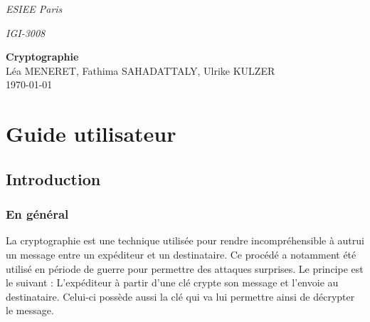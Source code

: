 \documentclass[a4paper,12pt,abstracton,titlepage]{scrartcl}
\begin{document}

{\Large\noindent \emph{ESIEE Paris}}

{\Large\noindent \emph{IGI-3008}}
\vspace{1cm}
\begin{center}
	{\huge \textbf{Cryptographie}
	\\
	\vspace{0.3cm}
	\large Léa MENERET, Fathima SAHADATTALY, Ulrike KULZER
	\\
	\vspace{0.2cm}
	\today}
\end{center}
\vspace{1cm}
\tableofcontents

\setcounter{page}{1} %


\newpage
\section{Guide utilisateur}
\subsection{Introduction}
\subsubsection{En général}
La cryptographie est une technique utilisée pour rendre incompréhensible à autrui un message entre un expéditeur et un destinataire. Ce procédé a notamment été utilisé en période de guerre pour permettre des attaques surprises. 
Le principe est le suivant : L'expéditeur à partir d'une clé crypte son message et l'envoie au destinataire. Celui-ci possède aussi la clé qui va lui permettre ainsi de décrypter le message.
\end{document}
